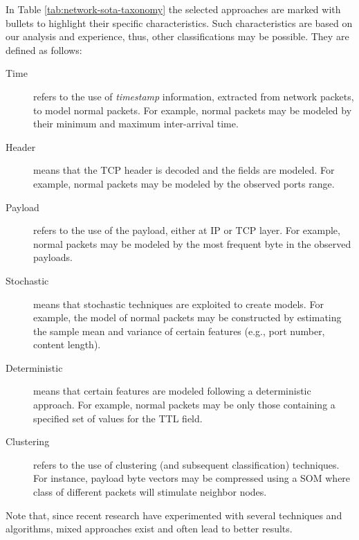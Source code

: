 In Table \ref{tab:network-sota-taxonomy} the selected approaches are
marked with bullets to highlight their specific characteristics. Such
characteristics are based on our analysis and experience, thus, other
classifications may be possible. They are defined as follows:

\begin{description}
\item[Time] refers to the use of \emph{timestamp} information,
extracted from network packets, to model normal packets. For example,
normal packets may be modeled by their minimum and maximum
inter-arrival time.
\item[Header] means that the \ac{TCP} header is decoded and
the fields are modeled. For example, normal packets may be modeled by
the observed ports range.
\item[Payload] refers to the use of the payload, either at
\ac{IP} or \ac{TCP} layer. For example, normal
packets may be modeled by the most frequent byte in the observed
payloads.
\item[Stochastic] means that stochastic techniques are exploited to
create models. For example, the model of normal packets may be
constructed by estimating the sample mean and variance of certain
features (e.g., port number, content length).
\item[Deterministic] means that certain features are modeled following
a deterministic approach. For example, normal packets may be only
those containing a specified set of values for the \ac{TTL}
field.
\item[Clustering] refers to the use of clustering (and subsequent
classification) techniques. For instance, payload byte vectors may be
compressed using a \ac{SOM} where class of different packets will
stimulate neighbor nodes.
\end{description}

Note that, since recent research have experimented with several
techniques and algorithms, mixed approaches exist and often lead to
better results.

